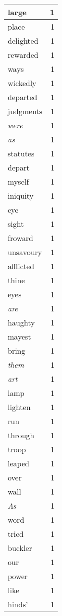 \begin{center}
\begin{longtable}{l|r}
large & 1 \\ \hline
place & 1 \\ \hline
delighted & 1 \\ \hline
rewarded & 1 \\ \hline
ways & 1 \\ \hline
wickedly & 1 \\ \hline
departed & 1 \\ \hline
judgments & 1 \\ \hline
\emph{were} & 1 \\ \hline
\emph{as} & 1 \\ \hline
statutes & 1 \\ \hline
depart & 1 \\ \hline
myself & 1 \\ \hline
iniquity & 1 \\ \hline
eye & 1 \\ \hline
sight & 1 \\ \hline
froward & 1 \\ \hline
unsavoury & 1 \\ \hline
afflicted & 1 \\ \hline
thine & 1 \\ \hline
eyes & 1 \\ \hline
\emph{are} & 1 \\ \hline
haughty & 1 \\ \hline
mayest & 1 \\ \hline
bring & 1 \\ \hline
\emph{them} & 1 \\ \hline
\emph{art} & 1 \\ \hline
lamp & 1 \\ \hline
lighten & 1 \\ \hline
run & 1 \\ \hline
through & 1 \\ \hline
troop & 1 \\ \hline
leaped & 1 \\ \hline
over & 1 \\ \hline
wall & 1 \\ \hline
\emph{As} & 1 \\ \hline
word & 1 \\ \hline
tried & 1 \\ \hline
buckler & 1 \\ \hline
our & 1 \\ \hline
power & 1 \\ \hline
like & 1 \\ \hline
hinds' & 1 \\ \hline

\end{longtable}
\end{center}
